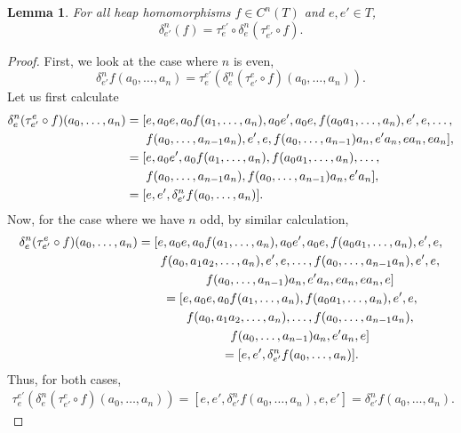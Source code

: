 \documentclass[10pt,a4paper]{amsart}
\numberwithin{equation}{section}
\newtheorem{Lemma}[Theorem]{Lemma}
\begin{document}
\begin{Lemma} \label{complem}
For all heap homomorphisms $f\in C^n(T)$ and $e,e'\in T$,
\[
\delta^{n}_{e'} ( f )= \tau_{e}^{e'} \circ \delta^{n}_{e} ( \tau^{e}_{e'} \circ f). \]
\end{Lemma}
\begin{proof}
First, we look at the case where $n$ is even,
\[\delta^{n}_{e'} f(a_0,\dots,a_n) = \tau^{e'}_{e} (\delta^{n}_{e}(\tau^{e}_{e'} \circ f)(a_0,\dots,a_n) ). \]
Let us first calculate
\begin{align*}
 &\delta^n_{e} (\tau^e_{e'} \circ f)(a_0 ,\dots, a_n) = [e,a_0 e, a_0 f(a_1,\dots,a_n), a_0 e', a_0 e,f(a_0 a_1,\dots,a_n),e',e,\dots, \\
 & \hphantom{\delta^n_{e} (\tau^e_{e'} \circ f)(a_0 ,\dots, a_n) =[}{} f(a_0,\dots,a_{n-1}a_n),e',e,f(a_0,\dots,a_{n-1})a_n,e' a_n,ea_n,ea_n], \\
 & \hphantom{\delta^n_{e} (\tau^e_{e'} \circ f)(a_0 ,\dots, a_n) }{} =[e,a_0 e', a_0 f(a_1,\dots,a_n),f(a_0 a_1,\dots,a_n),\dots, \\
 & \hphantom{\delta^n_{e} (\tau^e_{e'} \circ f)(a_0 ,\dots, a_n) =[}{}  f(a_0,\dots,a_{n-1} a_n), f(a_0,\dots,a_{n-1})a_n,e' a_n], \\
 & \hphantom{\delta^n_{e} (\tau^e_{e'} \circ f)(a_0 ,\dots, a_n)}{} = [e,e', \delta^n_{e'} f(a_0,\dots,a_n)].
\end{align*}
Now, for the case where we have $n$ odd, by similar calculation,
\begin{gather*}
 \delta^n_{e} (\tau^e_{e'} \circ f)(a_0 ,\dots, a_n) = [e,a_0 e, a_0 f(a_1,\dots,a_n), a_0 e', a_0 e,f(a_0 a_1,\dots,a_n),e',e, \\
\hphantom{\delta^n_{e} (\tau^e_{e'} \circ f)(a_0 ,\dots, a_n) = [}{}
 f(a_0, a_1 a_2,\dots,a_n),e',e, \dots,f(a_0,\dots,a_{n-1}a_n),e',e, \\
\hphantom{\delta^n_{e} (\tau^e_{e'} \circ f)(a_0 ,\dots, a_n) = [}{} f(a_0,\dots,a_{n-1})a_n,e' a_n,ea_n,ea_n,e] \\
\hphantom{\delta^n_{e} (\tau^e_{e'} \circ f)(a_0 ,\dots, a_n) }{} = [e,a_0 e,a_0 f(a_1,\dots,a_n), f(a_0 a_1,\dots,a_n),e',e, \\
\hphantom{\delta^n_{e} (\tau^e_{e'} \circ f)(a_0 ,\dots, a_n) = [}{} f(a_0,a_1 a_2,\dots,a_n),\dots,f(a_0,\dots,a_{n-1}a_n), \\
\hphantom{\delta^n_{e} (\tau^e_{e'} \circ f)(a_0 ,\dots, a_n) = [}{} f(a_0,\dots,a_{n-1})a_n,e' a_n,e]\\
\hphantom{\delta^n_{e} (\tau^e_{e'} \circ f)(a_0 ,\dots, a_n)}{} =[e,e', \delta^n_{e'} f(a_0,\dots,a_n)].
\end{gather*}
Thus, for both cases,
\begin{align*}
\tau^{e'}_e (\delta^n_e (\tau^e_{e'} \circ f)(a_0,\dots,a_n)) = [e,e',\delta^n_{e'} f(a_0,\dots,a_n),e,e'] = \delta^n_{e'} f(a_0,\dots,a_n).\tag*{\qed}
\end{align*} \renewcommand{\qed}{}
\end{proof}
\end{document}
